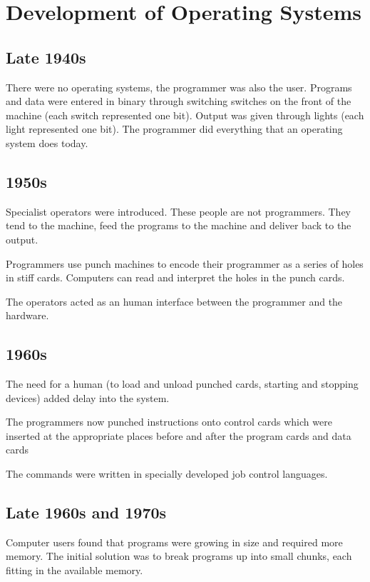 
\section*{Development of Operating Systems}

\subsection*{Late 1940s}
There were no operating systems, the programmer was also the user. Programs and data were entered in binary through switching switches on the front of the machine (each switch represented one bit). Output was given through lights (each light represented one bit). The programmer did everything that an operating system does today.

\subsection*{1950s}
Specialist operators were introduced. These people are not programmers. They tend to the machine, feed the programs to the machine and deliver back to the output.

Programmers use punch machines to encode their programmer as a series of holes in stiff cards. Computers can read and interpret the holes in the punch cards.

The operators acted as an human interface between the programmer and the hardware. 

\subsection*{1960s}
The need for a human (to load and unload punched cards, starting and stopping devices) added delay into the system. 

The programmers now punched instructions onto control cards which were inserted at the appropriate places before and after the program cards and data cards

The commands were written in specially developed job control languages. 

\subsection*{Late 1960s and 1970s}
Computer users found that programs were growing in size and required more memory. The initial solution was to break programs up into small chunks, each fitting in the available memory.

